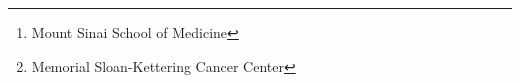 \author{
Timothy O'Donnell\thanks{Mount Sinai School of Medicine} \and Arun Ahuja\footnotemark[1] \and Alexandra Snyder\thanks{Memorial Sloan-Kettering Cancer Center} \and Jeff Hammerbacher\footnotemark[1]
}
